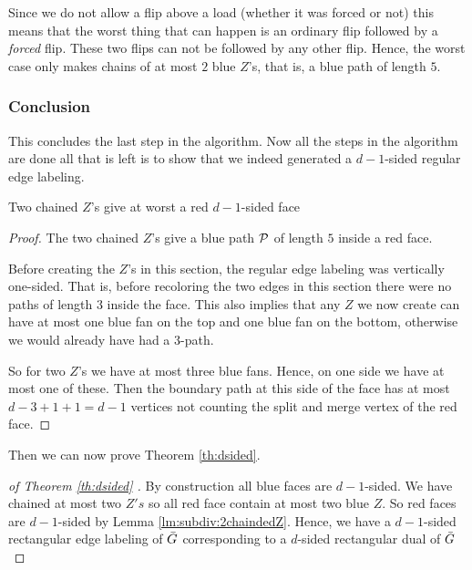   Since we do not allow a flip above a load (whether it was forced or not) this means that the worst thing that can happen is an ordinary flip followed by a \emph{forced} flip. These two flips can not be followed by any other flip. Hence, the worst case only makes chains of at most $2$ blue $Z$'s, that is, a blue path of length $5$.


\subsubsection{Conclusion}
  This concludes the last step in the algorithm.
  Now all the steps in the algorithm are done all that is left is to show that we indeed generated a $d-1$-sided regular edge labeling.
  \begin{lemma}
    \label{lm:subdiv:2chaindedZ}
    Two chained $Z$'s give at worst a red $d-1$-sided face
  \end{lemma}
  \begin{proof}
    The two chained $Z$'s give a blue path $\P$ of length $5$ inside a red face.

    Before creating the $Z$'s in this section, the regular edge labeling was vertically one-sided.
    That is, before recoloring the two edges in this section there were no paths of length $3$ inside the face.
    This also implies that any $Z$ we now create can have at most one blue fan on the top and one blue fan on the bottom, otherwise we would already have had a $3$-path.

    So for two $Z$'s we have at most three blue fans.
    Hence, on one side we have at most one of these.
    Then the boundary path at this side of the face has at most $d-3 + 1 +1 =d-1$ vertices not counting the split and merge vertex of the red face.
  \end{proof}

    Then we can now prove Theorem \ref{th:dsided}.

  \begin{proof}[of Theorem \ref{th:dsided} ]
    By construction all blue faces are $d-1$-sided. We have chained at most two $Z's$ so all red face contain at most two blue $Z$. So red faces are $d-1$-sided by Lemma \ref{lm:subdiv:2chaindedZ}. Hence, we have a $d-1$-sided rectangular edge labeling of $\ext G$ corresponding to a $d$-sided rectangular dual of $\ext G$
  \end{proof}
